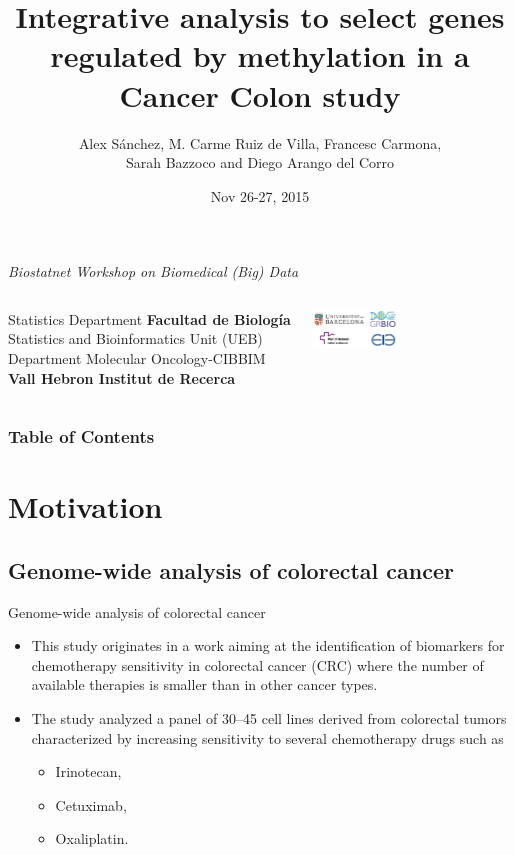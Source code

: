 \documentclass[handout]{beamer}
\title[Scatterplot clustering]{Integrative analysis to select genes regulated by methylation in a Cancer Colon study}
\author[Álex Sánchez]{Alex Sánchez, M. Carme Ruiz de Villa, Francesc Carmona, \\ Sarah Bazzoco and Diego Arango del Corro}
\date[]{Nov 26-27, 2015}
\begin{document}
\begin{frame}
\begin{scriptsize}
\begin{center}
  \emph{ Biostatnet Workshop on Biomedical (Big) Data}
\end{center}
\end{scriptsize}

\titlepage

\begin{columns}
   \scriptsize
   Statistics Department \textbf{Facultad de Biología}\\
   Statistics and Bioinformatics Unit (UEB)\\
   Department Molecular Oncology-CIBBIM \\ \textbf{Vall Hebron Institut de Recerca}

  \hfill{}
  \includegraphics[height=1cm]{images/alllogos.png}

\end{columns}
\end{frame}


\begin{frame}
\frametitle{Table of Contents}
\tableofcontents
\end{frame}

\section{Motivation}

\subsection{Genome-wide analysis of colorectal cancer}

\begin{frame}{Genome-wide analysis of colorectal cancer}
  \begin{itemize}
  \item This study originates in a work aiming at the identification of biomarkers for chemotherapy sensitivity in colorectal cancer (CRC) where the number of available therapies is smaller than in other cancer types.
  \item The study analyzed a panel of 30--45 cell lines derived from colorectal tumors characterized by increasing sensitivity to several chemotherapy drugs such as \begin{itemize}
                \item Irinotecan,
                \item Cetuximab,
                \item Oxaliplatin.
              \end{itemize}
  \end{itemize}
\end{frame}
\end{document}
